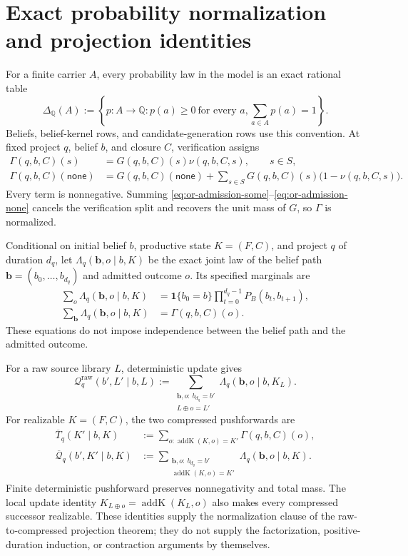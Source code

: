 \section{Exact probability normalization and projection identities}
\label{or:aor-probability-normalization}

For a finite carrier \(A\), every probability law in the model is an exact
rational table
\[
  \Delta_{\mathbb Q}(A):=
  \left\{p:A\to\mathbb Q:
  p(a)\geq0\ \text{for every }a,
  \sum_{a\in A}p(a)=1\right\}.
\]
Beliefs, belief-kernel rows, and candidate-generation rows use this convention.
At fixed project \(q\), belief \(b\), and closure \(C\), verification assigns
\begin{align}
 \Gamma(q,b,C)(s)
   &=G(q,b,C)(s)\nu(q,b,C,s),\qquad s\in S,
   \label{eq:or-admission-some}\\
 \Gamma(q,b,C)(\mathsf{none})
   &=G(q,b,C)(\mathsf{none})
     +\sum_{s\in S}G(q,b,C)(s)
       \bigl(1-\nu(q,b,C,s)\bigr).
   \label{eq:or-admission-none}
\end{align}
Every term is nonnegative. Summing
\eqref{eq:or-admission-some}--\eqref{eq:or-admission-none} cancels the
verification split and recovers the unit mass of \(G\), so \(\Gamma\) is
normalized.

Conditional on initial belief \(b\), productive state \(K=(F,C)\), and
project \(q\) of duration \(d_q\), let
\(\Lambda_q(\mathbf b,o\mid b,K)\) be the exact joint law of the belief path
\(\mathbf b=(b_0,\ldots,b_{d_q})\) and admitted outcome \(o\). Its specified
marginals are
\begin{align}
 \sum_o\Lambda_q(\mathbf b,o\mid b,K)
   &=\mathbf1\{b_0=b\}
     \prod_{t=0}^{d_q-1}P_B(b_t,b_{t+1}),
   \label{eq:or-completion-path-marginal}\\
 \sum_{\mathbf b}\Lambda_q(\mathbf b,o\mid b,K)
   &=\Gamma(q,b,C)(o).
   \label{eq:or-completion-outcome-marginal}
\end{align}
These equations do not impose independence between the belief path and the
admitted outcome.

For a raw source library \(L\), deterministic update gives
\[
 \mathcal Q_q^{\mathrm{raw}}(b',L'\mid b,L)
 :=\sum_{\substack{\mathbf b,o:\ b_{d_q}=b'\\L\oplus o=L'}}
   \Lambda_q(\mathbf b,o\mid b,K_L).
\]
For realizable \(K=(F,C)\), the two compressed pushforwards are
\begin{align}
 \overline T_q(K'\mid b,K)
   &:=\sum_{o:\operatorname{addK}(K,o)=K'}
       \Gamma(q,b,C)(o),
   \label{eq:or-compressed-outcome-law}\\
 \overline{\mathcal Q}_q(b',K'\mid b,K)
   &:=\sum_{\substack{\mathbf b,o:\ b_{d_q}=b'\\
       \operatorname{addK}(K,o)=K'}}
       \Lambda_q(\mathbf b,o\mid b,K).
   \label{eq:or-compressed-joint-law}
\end{align}
Finite deterministic pushforward preserves nonnegativity and total mass.
The local update identity
\(K_{L\oplus o}=\operatorname{addK}(K_L,o)\) also makes every compressed
successor realizable. These identities supply the normalization clause of the
raw-to-compressed projection theorem; they do not supply the factorization,
positive-duration induction, or contraction arguments by themselves.
